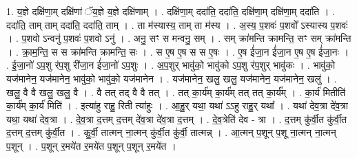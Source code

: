 \documentclass[17pt]{extarticle}
\begin{document}
1. य॒ज्ञे दक्षि॑णा॒म् दक्षि॑णां ॅय॒ज्ञे य॒ज्ञे दक्षि॑णाम् । . दक्षि॑णा॒म् ददा॑ति॒ ददा॑ति॒ दक्षि॑णा॒म् दक्षि॑णा॒म् ददा॑ति । . ददा॑ति॒ ताम् ताम् ददा॑ति॒ ददा॑ति॒ ताम् । . ता म॑स्यास्य॒ ताम् ता म॑स्य । . अ॒स्य॒ प॒शवः॑ प॒शवो᳚ ऽस्यास्य प॒शवः॑ । . प॒शवो ऽन्वनु॑ प॒शवः॑ प॒शवो ऽनु॑ । . अनु॒ सꣳ स मन्वनु॒ सम् । . सम् क्रा॑मन्ति क्रामन्ति॒ सꣳ सम् क्रा॑मन्ति । . क्रा॒म॒न्ति॒ स स क्रा॑मन्ति क्रामन्ति॒ सः । . स ए॒ष ए॒ष स स ए॒षः । . ए॒ष ई॑जा॒न ई॑जा॒न ए॒ष ए॒ष ई॑जा॒नः । . ई॒जा॒नो॑ ऽप॒शु र॑प॒शु री॑जा॒न ई॑जा॒नो॑ ऽप॒शुः । . अ॒प॒शुर् भावु॑को॒ भावु॑को ऽप॒शु र॑प॒शुर् भावु॑कः । . भावु॑को॒ यज॑मानेन॒ यज॑मानेन॒ भावु॑को॒ भावु॑को॒ यज॑मानेन । . यज॑मानेन॒ खलु॒ खलु॒ यज॑मानेन॒ यज॑मानेन॒ खलु॑ । . खलु॒ वै वै खलु॒ खलु॒ वै । . वै तत् तद् वै वै तत् । . तत् का॒र्य॑म् का॒र्य॑म् तत् तत् का॒र्य᳚म् । . का॒र्य॑ मितीति॑ का॒र्य॑म् का॒र्य॑ मिति॑ । . इत्या॑हु राहु॒ रिती त्या॑हुः । . आ॒हु॒र् यथा॒ यथा॑ ऽऽहु राहु॒र् यथा᳚ । . यथा॑ देव॒त्रा दे॑व॒त्रा यथा॒ यथा॑ देव॒त्रा । . दे॒व॒त्रा द॒त्तम् द॒त्तम् दे॑व॒त्रा दे॑व॒त्रा द॒त्तम् । . दे॒व॒त्रेति॑ देव - त्रा । . द॒त्तम् कु॑र्वी॒त कु॑र्वी॒त द॒त्तम् द॒त्तम् कु॑र्वी॒त । . कु॒र्वी॒ तात्मन् ना॒त्मन् कु॑र्वी॒त कु॑र्वी॒ तात्मन्न् । . आ॒त्मन् प॒शून् प॒शू ना॒त्मन् ना॒त्मन् प॒शून् । . प॒शून् र॒मये॑त र॒मये॑त प॒शून् प॒शून् र॒मये॑त । \newline
\end{document}
